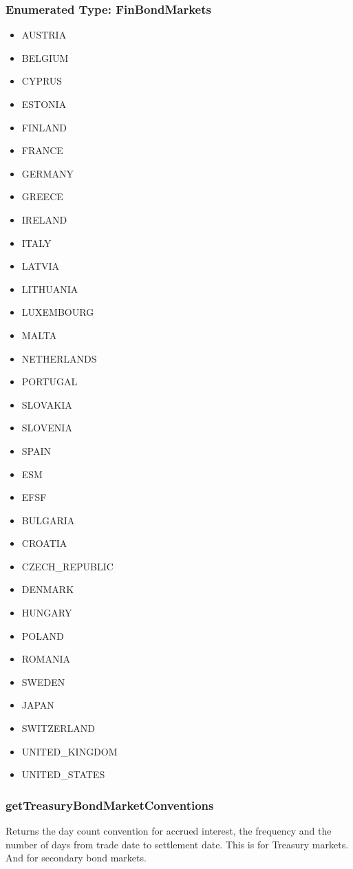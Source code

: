\documentclass[twoside,11pt]{book}
\begin{document}
\subsubsection{Enumerated Type: FinBondMarkets}
\begin{itemize}
\item{AUSTRIA}
\item{BELGIUM}
\item{CYPRUS}
\item{ESTONIA}
\item{FINLAND}
\item{FRANCE}
\item{GERMANY}
\item{GREECE}
\item{IRELAND}
\item{ITALY}
\item{LATVIA}
\item{LITHUANIA}
\item{LUXEMBOURG}
\item{MALTA}
\item{NETHERLANDS}
\item{PORTUGAL}
\item{SLOVAKIA}
\item{SLOVENIA}
\item{SPAIN}
\item{ESM}
\item{EFSF}
\item{BULGARIA}
\item{CROATIA}
\item{CZECH\_REPUBLIC}
\item{DENMARK}
\item{HUNGARY}
\item{POLAND}
\item{ROMANIA}
\item{SWEDEN}
\item{JAPAN}
\item{SWITZERLAND}
\item{UNITED\_KINGDOM}
\item{UNITED\_STATES}
\end{itemize}

\subsubsection*{{\bf getTreasuryBondMarketConventions}}
Returns the day count convention for accrued interest, the frequency and the number of days from trade date to settlement date.  This is for Treasury markets. And for secondary bond markets.  
\end{document}

